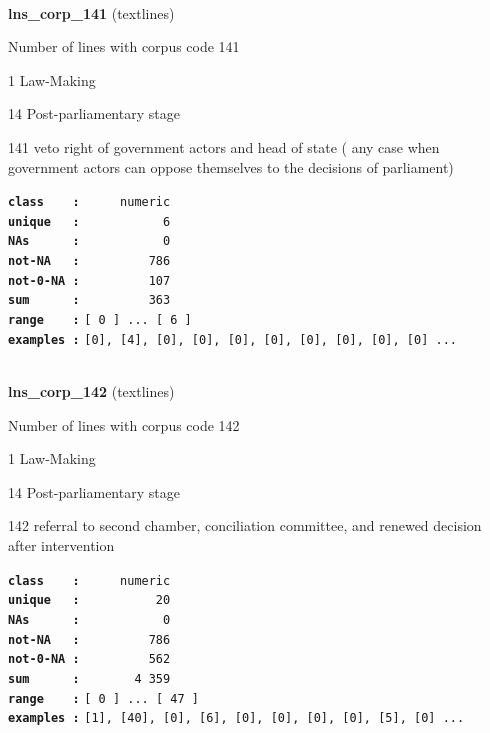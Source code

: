 \documentclass[]{article}
\begin{document}
~

\textbf{lns\_corp\_141} (textlines)

Number of lines with corpus code 141

1 Law-Making

14 Post-parliamentary stage

141 veto right of government actors and head of state ( any case when
government actors can oppose themselves to the decisions of parliament)

\textbf{\texttt{class\ \ \ \ :}} \texttt{~~~~~numeric}\\
\textbf{\texttt{unique\ \ \ :}} \texttt{~~~~~~~~~~~6}\\
\textbf{\texttt{NAs\ \ \ \ \ \ :}} \texttt{~~~~~~~~~~~0}\\
\textbf{\texttt{not-NA\ \ \ :}} \texttt{~~~~~~~~~786}\\
\textbf{\texttt{not-0-NA\ :}} \texttt{~~~~~~~~~107}\\
\textbf{\texttt{sum\ \ \ \ \ \ :}} \texttt{~~~~~~~~~363}\\
\textbf{\texttt{range\ \ \ \ :}}
\texttt{{[}\ 0\ {]}\ ...\ {[}\ 6\ {]}}\\
\textbf{\texttt{examples\ :}}
\texttt{{[}0{]},\ {[}4{]},\ {[}0{]},\ {[}0{]},\ {[}0{]},\ {[}0{]},\ {[}0{]},\ {[}0{]},\ {[}0{]},\ {[}0{]}\ ...}\\

~

\textbf{lns\_corp\_142} (textlines)

Number of lines with corpus code 142

1 Law-Making

14 Post-parliamentary stage

142 referral to second chamber, conciliation committee, and renewed
decision after intervention

\textbf{\texttt{class\ \ \ \ :}} \texttt{~~~~~numeric}\\
\textbf{\texttt{unique\ \ \ :}} \texttt{~~~~~~~~~~20}\\
\textbf{\texttt{NAs\ \ \ \ \ \ :}} \texttt{~~~~~~~~~~~0}\\
\textbf{\texttt{not-NA\ \ \ :}} \texttt{~~~~~~~~~786}\\
\textbf{\texttt{not-0-NA\ :}} \texttt{~~~~~~~~~562}\\
\textbf{\texttt{sum\ \ \ \ \ \ :}} \texttt{~~~~~~~4~359}\\
\textbf{\texttt{range\ \ \ \ :}}
\texttt{{[}\ 0\ {]}\ ...\ {[}\ 47\ {]}}\\
\textbf{\texttt{examples\ :}}
\texttt{{[}1{]},\ {[}40{]},\ {[}0{]},\ {[}6{]},\ {[}0{]},\ {[}0{]},\ {[}0{]},\ {[}0{]},\ {[}5{]},\ {[}0{]}\ ...}\\
\end{document}
